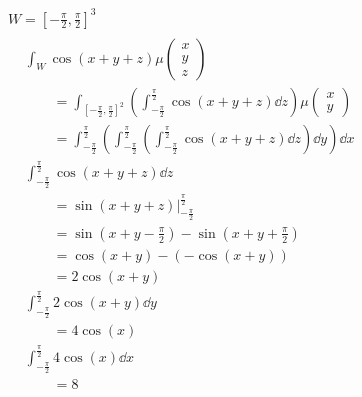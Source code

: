 \begin{bsp}
	\begin{gather*}
		W = \left[ -\frac{\pi}{2} , \frac{\pi}{2} \right]^3 \\
		\begin{split}
			&\int_W \cos( x + y + z ) \mu\begin{pmatrix} x \\ y \\ z \end{pmatrix} \\
				&\qquad= \int_{ \left[ -\frac{\pi}{2} , \frac{\pi}{2} \right]^2 } \left( \int_{-\frac{\pi}{2}}^{\frac{\pi}{2}} \cos( x + y + z ) \dd z \right) \mu\begin{pmatrix} x \\ y \end{pmatrix} \\
				&\qquad= \int_{-\frac{\pi}{2}}^{\frac{\pi}{2}} \left( \int_{-\frac{\pi}{2}}^{\frac{\pi}{2}} \left( \int_{-\frac{\pi}{2}}^{\frac{\pi}{2}} \cos( x + y + z ) \dd z \right) \dd y \right) \dd x \\
			&\int_{-\frac{\pi}{2}}^{\frac{\pi}{2}} \cos( x + y + z ) \dd z \\
				&\qquad= \sin( x + y + z )|_{-\frac{\pi}{2}}^{\frac{\pi}{2}} \\
				&\qquad= \sin( x + y - \frac{\pi}{2} ) - \sin\left( x + y + \frac{\pi}{2} \right) \\
				&\qquad= \cos( x+ y ) - ( -\cos( x + y )) \\
				&\qquad= 2\cos( x + y ) \\
			&\int_{-\frac{\pi}{2}}^{\frac{\pi}{2}} 2\cos( x + y ) \dd y \\
				&\qquad= 4 \cos( x ) \\
			&\int_{-\frac{\pi}{2}}^{\frac{\pi}{2}} 4\cos( x ) \dd x \\
				&\qquad= 8
		\end{split}
	\end{gather*}
\end{bsp}
